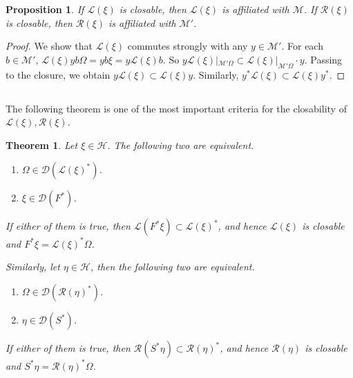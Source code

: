 \documentclass[12pt,b5paper,notitlepage]{article}
\theoremstyle{definition}
\theoremstyle{plain}
\newtheorem{thm}[df]{Theorem}
\newtheorem{pp}[df]{Proposition}
\newcommand{\mc}{\mathcal}
\newcommand{\Dom}{\scr{D}}
\newcommand{\scr}{\mathscr}
\numberwithin{equation}{section}
\begin{document}
\begin{pp}\label{lba13}
If $\scr L(\xi)$ is closable, then $\scr L(\xi)$ is affiliated with $\mc M$. If $\scr R(\xi)$ is closable, then $\scr R(\xi)$ is affiliated with $\mc M'$.
\end{pp}

\begin{proof}
We show that $\scr L(\xi)$ commutes strongly with any $y\in\mc M'$. For each $b\in\mc M'$, $\scr L(\xi)yb\Omega=yb\xi=y\scr L(\xi)b$. So $y\scr L(\xi)|_{\mc M'\Omega}\subset \scr L(\xi)|_{\mc M'\Omega}\cdot y$. Passing to the closure, we obtain $y\scr L(\xi)\subset \scr L(\xi)y$. Similarly, $y^*\scr L(\xi)\subset \scr L(\xi)y^*$.
\end{proof}



\subsection{}

The following theorem is one of the most important criteria for the closability of $\scr L(\xi),\scr R(\xi)$.

\begin{thm}\label{lba12}
Let $\xi\in\mc H$. The following two are equivalent.
\begin{enumerate}[label=(\alph*)]
	\item $\Omega\in\Dom(\scr L(\xi)^*)$.
	\item $\xi\in\Dom(F^*)$.
\end{enumerate}
If either of them is true, then $\scr L(F^*\xi)\subset\scr L(\xi)^*$, and hence $\scr L(\xi)$ is closable and $F^*\xi=\scr L(\xi)^*\Omega$.

Similarly, let $\eta\in\mc H$, then the following two are equivalent.
\begin{enumerate}
	\item[(a')] $\Omega\in\Dom(\scr R(\eta)^*)$.
	\item[(b')] $\eta\in\Dom(S^*)$.
\end{enumerate}
If either of them is true, then $\scr R(S^*\eta)\subset\scr R(\eta)^*$, and hence $\scr R(\eta)$ is closable and $S^*\eta=\scr R(\eta)^*\Omega$.
\end{thm}
\end{document}
